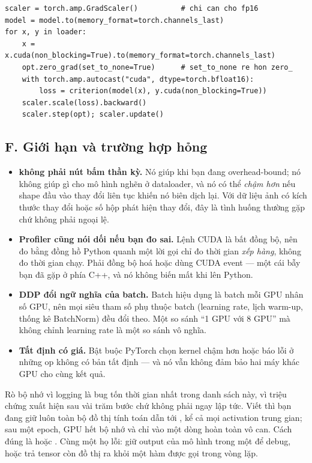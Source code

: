 \documentclass[../../../deep_learning.tex]{subfiles}
\begin{document}
\begin{lstlisting}[style=py]
scaler = torch.amp.GradScaler()          # chi can cho fp16
model = model.to(memory_format=torch.channels_last)
for x, y in loader:
    x = x.cuda(non_blocking=True).to(memory_format=torch.channels_last)
    opt.zero_grad(set_to_none=True)      # set_to_none re hon zero_
    with torch.amp.autocast("cuda", dtype=torch.bfloat16):
        loss = criterion(model(x), y.cuda(non_blocking=True))
    scaler.scale(loss).backward()
    scaler.step(opt); scaler.update()
\end{lstlisting}

\subsection{F. Giới hạn và trường hợp hỏng}
\begin{itemize}
\item \textbf{ không phải nút bấm thần kỳ.} Nó giúp khi bạn đang overhead-bound; nó không giúp gì cho mô hình nghẽn ở dataloader, và nó có thể \emph{chậm hơn} nếu shape đầu vào thay đổi liên tục khiến nó biên dịch lại. Với dữ liệu ảnh có kích thước thay đổi hoặc số hộp phát hiện thay đổi, đây là tình huống thường gặp chứ không phải ngoại lệ.
\item \textbf{Profiler cũng nói dối nếu bạn đo sai.} Lệnh CUDA là bất đồng bộ, nên đo bằng đồng hồ Python quanh một lời gọi chỉ đo thời gian \emph{xếp hàng}, không đo thời gian chạy. Phải đồng bộ hoá hoặc dùng CUDA event --- một cái bẫy bạn đã gặp ở phía C++, và nó không biến mất khi lên Python.
\item \textbf{DDP đổi ngữ nghĩa của batch.} Batch hiệu dụng là batch mỗi GPU nhân số GPU, nên mọi siêu tham số phụ thuộc batch (learning rate, lịch warm-up, thống kê BatchNorm) đều đổi theo. Một so sánh ``1 GPU với 8 GPU'' mà không chỉnh learning rate là một so sánh vô nghĩa.
\item \textbf{Tất định có giá.} Bật  buộc PyTorch chọn kernel chậm hơn hoặc báo lỗi ở những op không có bản tất định --- và nó vẫn không đảm bảo hai máy khác GPU cho cùng kết quả.
\end{itemize}

\begin{cambay}
Rò bộ nhớ vì logging là bug tốn thời gian nhất trong danh sách này, vì triệu chứng xuất hiện sau vài trăm bước chứ không phải ngay lập tức. Viết  thì bạn đang giữ luôn toàn bộ đồ thị tính toán dẫn tới , kể cả mọi activation trung gian; sau một epoch, GPU hết bộ nhớ và  chỉ vào một dòng hoàn toàn vô can. Cách đúng là  hoặc . Cùng một họ lỗi: giữ output của mô hình trong một  để debug, hoặc trả tensor còn đồ thị ra khỏi một hàm được gọi trong vòng lặp.
\end{cambay}
\end{document}
